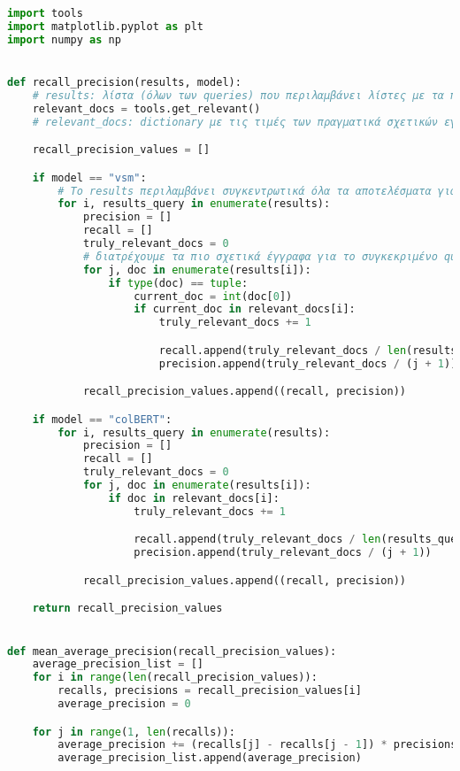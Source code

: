 \begin{lstlisting}[language=Python]
import tools
import matplotlib.pyplot as plt
import numpy as np


def recall_precision(results, model):
    # results: λίστα (όλων των queries) που περιλαμβάνει λίστες με τα πιο σχετικά έγγραφα, όπως υπολογίστηκαν από το cosine similarity
    relevant_docs = tools.get_relevant()
    # relevant_docs: dictionary με τις τιμές των πραγματικά σχετικών εγγράφων του Relevent_20

    recall_precision_values = []

    if model == "vsm":
        # Το results περιλαμβάνει συγκεντρωτικά όλα τα αποτελέσματα για κάθε query. Διατρέχουμε το κάθε query μεμονομένα...
        for i, results_query in enumerate(results):
            precision = []
            recall = []
            truly_relevant_docs = 0
            # διατρέχουμε τα πιο σχετικά έγγραφα για το συγκεκριμένο query...
            for j, doc in enumerate(results[i]):
                if type(doc) == tuple:
                    current_doc = int(doc[0])
                    if current_doc in relevant_docs[i]:
                        truly_relevant_docs += 1

                        recall.append(truly_relevant_docs / len(results_query))
                        precision.append(truly_relevant_docs / (j + 1))

            recall_precision_values.append((recall, precision))

    if model == "colBERT":
        for i, results_query in enumerate(results):
            precision = []
            recall = []
            truly_relevant_docs = 0
            for j, doc in enumerate(results[i]):
                if doc in relevant_docs[i]:
                    truly_relevant_docs += 1

                    recall.append(truly_relevant_docs / len(results_query))
                    precision.append(truly_relevant_docs / (j + 1))

            recall_precision_values.append((recall, precision))

    return recall_precision_values


def mean_average_precision(recall_precision_values):
    average_precision_list = []
    for i in range(len(recall_precision_values)):
        recalls, precisions = recall_precision_values[i]
        average_precision = 0

    for j in range(1, len(recalls)):
        average_precision += (recalls[j] - recalls[j - 1]) * precisions[j]
        average_precision_list.append(average_precision)


\end{lstlisting}
